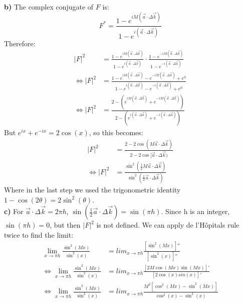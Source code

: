 \documentclass[12pt]{article}
\begin{document}
\textbf{b)} The complex conjugate of $F$ is:
\begin{equation}
    F^* = \frac{1-e^{iM(\Vec{a} \cdot \Delta \Vec{k})}}{1-e^{i(\Vec{a} \cdot \Delta \Vec{k})}}
\end{equation}
Therefore:
\begin{align}
    |F|^2 &= \frac{1 - e^{iM(\Vec{a} \cdot \Delta \Vec{k})}}{1-e^{i(\Vec{a} \cdot \Delta \Vec{k})}} \cdot \frac{1-e^{-iM(\Vec{a} \cdot \Delta \Vec{k})}}{1-e^{-i(\Vec{a} \cdot \Delta \Vec{k})}} \\
    \Leftrightarrow |F|^2 &= \frac{1 - e^{iM(\Vec{a} \cdot \Delta \Vec{k})} - e^{-iM(\Vec{a} \cdot \Delta \Vec{k})} + e^0}{1 - e^{i(\Vec{a} \cdot \Delta \Vec{k})} - e^{-i(\Vec{a} \cdot \Delta \Vec{k})} + e^0} \\
    \Leftrightarrow |F|^2 &= \frac{2 - (e^{iM(\Vec{a} \cdot \Delta \Vec{k})} + e^{-iM(\Vec{a} \cdot \Delta \Vec{k})})}{2 - ( e^{i(\Vec{a} \cdot \Delta \Vec{k})} + e^{-i(\Vec{a} \cdot \Delta \Vec{k})})}
\end{align}
But $e^{ix}+e^{-ix} = 2\cos(x)$, so this becomes:
\begin{align}
    |F|^2 &= \frac{2-2\cos(M \Vec{a} \cdot \Delta \Vec{k})}{2-2\cos[\Vec{a} \cdot \Delta \Vec{k})} \\
    \Leftrightarrow |F|^2 &= \frac{\sin^2( \frac{1}{2} M \Vec{a} \cdot \Delta \Vec{k})}{\sin^2(\frac{1}{2} \Vec{a} \cdot \Delta \Vec{k})}
\end{align}
Where in the last step we used the trigonometric identity $1 - \cos(2 \theta) = 2\sin^2(\theta)$. \\

\textbf{c)} For $\Vec{a} \cdot \Delta \Vec{k} = 2 \pi h$, $\sin(\frac{1}{2} \Vec{a} \cdot \Delta \Vec{k}) = \sin(\pi h)$. Since h is an integer, $\sin(\pi h) = 0$, but then $|F|^2$ is not defined. We can apply de l'Hôpitals rule twice to find the limit:
\begin{align}
    \lim_{x\rightarrow \pi h} \frac{\sin^2(Mx)}{\sin^2(x)} &= lim_{x\rightarrow \pi h} \frac{[\sin^2(Mx)]''}{[\sin^2(x)]''} \\
    \Leftrightarrow \lim_{x\rightarrow \pi h} \frac{\sin^2(Mx)}{\sin^2(x)} &= lim_{x\rightarrow \pi h} \frac{[2M \cos(Mx)\sin(Mx)]'}{[2\cos(x)sin(x)]'} \\
    \Leftrightarrow \lim_{x\rightarrow \pi h} \frac{\sin^2(Mx)}{\sin^2(x)} &= lim_{x\rightarrow \pi h} \frac{M^2[\cos^2(Mx) - \sin^2(Mx)]}{\cos^2(x) - \sin^2(x)}
\end{align}
\end{document}
